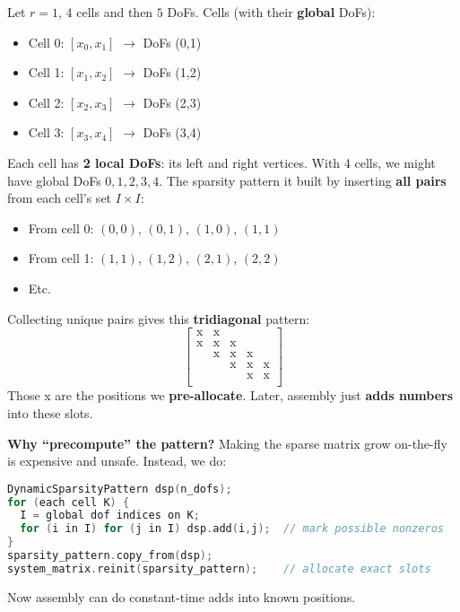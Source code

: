 \begin{enumerate}
    \begin{examplebox}[: 1D]
        Let $r=1$, 4 cells and then $5$ DoFs. Cells (with their \textbf{global} DoFs):
        \begin{itemize}
            \item Cell 0: $[x_0,x_1]$ $\rightarrow$ DoFs (0,1)
            \item Cell 1: $[x_1,x_2]$ $\rightarrow$ DoFs (1,2)
            \item Cell 2: $[x_2,x_3]$ $\rightarrow$ DoFs (2,3)
            \item Cell 3: $[x_3,x_4]$ $\rightarrow$ DoFs (3,4)
        \end{itemize}
        Each cell has \textbf{2 local DoFs}: its left and right vertices. With 4 cells, we might have global DoFs $0,1,2,3,4$. The sparsity pattern it built by inserting \textbf{all pairs} from each cell's set $I \times I$:
        \begin{itemize}
            \item From cell 0: $(0,0)$, $(0,1)$, $(1,0)$, $(1,1)$
            \item From cell 1: $(1,1)$, $(1,2)$, $(2,1)$, $(2,2)$
            \item Etc.
        \end{itemize}
        Collecting unique pairs gives this \textbf{tridiagonal} pattern:
        \begin{equation*}
            \begin{bmatrix}
                \mathrm{x}  & \mathrm{x}    &               &               & \\
                \mathrm{x}  & \mathrm{x}    & \mathrm{x}    &               & \\
                            & \mathrm{x}    & \mathrm{x}    & \mathrm{x}    & \\
                            &               & \mathrm{x}    & \mathrm{x}    & \mathrm{x} \\
                            &               &               & \mathrm{x}    & \mathrm{x} \\
            \end{bmatrix}
        \end{equation*}
        Those x are the positions we \textbf{pre-allocate}. Later, assembly just \textbf{adds numbers} into these slots.
    \end{examplebox}

    \textcolor{Green3}{ \textbf{Why ``precompute'' the pattern?}} Making the sparse matrix grow on-the-fly is expensive and unsafe. Instead, we do:
    \begin{lstlisting}[language=C++]
DynamicSparsityPattern dsp(n_dofs);
for (each cell K) {
  I = global dof indices on K;
  for (i in I) for (j in I) dsp.add(i,j);  // mark possible nonzeros
}
sparsity_pattern.copy_from(dsp);
system_matrix.reinit(sparsity_pattern);    // allocate exact slots
    \end{lstlisting}
    Now assembly can do constant-time adds into known positions.


\end{enumerate}
